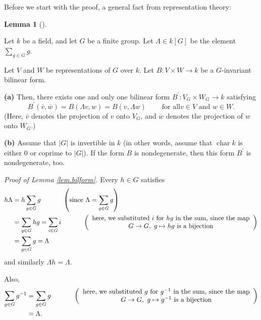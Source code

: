 \documentclass
[numbers=enddot,12pt,final,onecolumn,german,notitlepage]{scrartcl}%
\theoremstyle{definition}
\newtheorem{lem}[theo]{Lemma}
\newenvironment{lemma}[1][]
{\begin{lem}[#1]\begin{leftbar}}
{\end{leftbar}\end{lem}}
\begin{document}
Before we start with the proof, a general fact from representation theory:

\begin{lemma}
\label{lem.bilform}Let $k$ be a field, and let $G$ be a finite group. Let
$\Lambda\in k\left[  G\right]  $ be the element $\sum\limits_{g\in G}g$.

Let $V$ and $W$ be representations of $G$ over $k$. Let $B:V\times
W\rightarrow k$ be a $G$-invariant bilinear form.

\textbf{(a)} Then, there exists one and only one bilinear form $B^{\prime
}:V_{G}\times W_{G}\rightarrow k$ satisfying%
\[
B^{\prime}\left(  \overline{v},\overline{w}\right)  =B\left(  \Lambda
v,w\right)  =B\left(  v,\Lambda w\right)  \ \ \ \ \ \ \ \ \ \ \text{for all
}v\in V\text{ and }w\in W\text{.}%
\]
(Here, $\overline{v}$ denotes the projection of $v$ onto $V_{G}$, and
$\overline{w}$ denotes the projection of $w$ onto $W_{G}$.)

\textbf{(b)} Assume that $\left\vert G\right\vert $ is invertible in $k$ (in
other words, assume that $\operatorname*{char}k$ is either $0$ or coprime to
$\left\vert G\right\vert $). If the form $B$ is nondegenerate, then this form
$B^{\prime}$ is nondegenerate, too.
\end{lemma}

\textit{Proof of Lemma \ref{lem.bilform}.} Every $h\in G$ satisfies%
\begin{align*}
h\Lambda &  =h\sum\limits_{g\in G}g\ \ \ \ \ \ \ \ \ \ \left(  \text{since
}\Lambda=\sum\limits_{g\in G}g\right) \\
&  =\sum\limits_{g\in G}hg=\sum\limits_{i\in G}i\ \ \ \ \ \ \ \ \ \ \left(
\begin{array}
[c]{c}%
\text{here, we substituted }i\text{ for }hg\text{ in the sum, since the map}\\
G\rightarrow G,\ g\mapsto hg\text{ is a bijection}%
\end{array}
\right) \\
&  =\sum\limits_{g\in G}g=\Lambda
\end{align*}
and similarly $\Lambda h=\Lambda$.

Also,%
\begin{align*}
\sum\limits_{g\in G}g^{-1}  &  =\sum\limits_{g\in G}%
g\ \ \ \ \ \ \ \ \ \ \left(
\begin{array}
[c]{c}%
\text{here, we substituted }g\text{ for }g^{-1}\text{ in the sum, since the
map}\\
G\rightarrow G,\ g\mapsto g^{-1}\text{ is a bijection}%
\end{array}
\right) \\
&  =\Lambda.
\end{align*}
\end{document}
